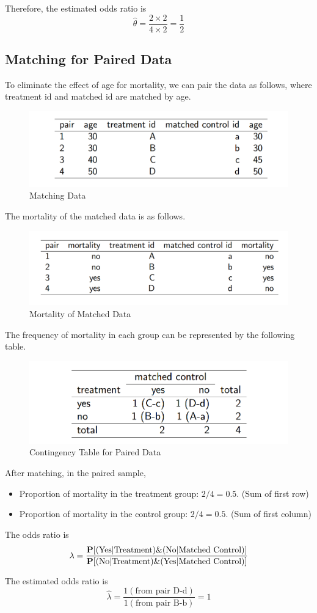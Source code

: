 Therefore, the estimated odds ratio is
\[\hat{\theta} = \frac{2 \times 2}{4 \times 2} = \frac{1}{2}\]

\subsection{Matching for Paired Data}
To eliminate the effect of age for mortality, we can pair the data as follows, where treatment id and matched id are matched by age.
\begin{figure}[H]
	\centering
	\includegraphics[width=0.7\linewidth]{fig/screenshot003}
	\caption{Matching Data}
	\label{fig:screenshot003}
\end{figure}
The mortality of the matched data is as follows.
\begin{figure}[H]
	\centering
	\includegraphics[width=0.7\linewidth]{fig/screenshot004}
	\caption{Mortality of Matched Data}
	\label{fig:screenshot004}
\end{figure}

The frequency of mortality in each group can be represented by the following table.
\begin{figure}[H]
	\centering
	\includegraphics[width=0.7\linewidth]{fig/screenshot005}
	\caption{Contingency Table for Paired Data}
	\label{fig:screenshot005}
\end{figure}

After matching, in the paired sample,
\begin{itemize}
	\item Proportion of mortality in the treatment group: $2/4 = 0.5$. (Sum of first row)
	\item Proportion of mortality in the control group: $2/4 = 0.5$. (Sum of first column)
\end{itemize}

The odds ratio is 
\[\lambda = 
\frac
{\P[(\text{Yes}|\text{Treatment}) \& (\text{No}|\text{Matched Control})]}
{\P[(\text{No}|\text{Treatment}) \& (\text{Yes}|\text{Matched Control})]}
\]

The estimated odds ratio is
\[
\hat{\lambda} = 
\frac{1 (\text{from pair D-d})}{1 (\text{from pair B-b})} = 1
\]
